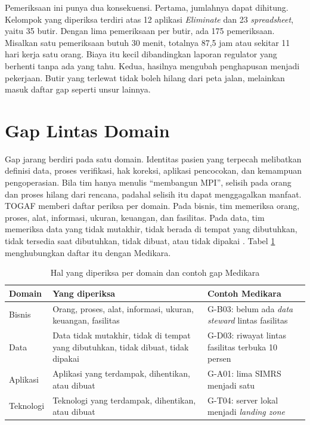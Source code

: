 Pemeriksaan ini punya dua konsekuensi. Pertama, jumlahnya dapat dihitung. Kelompok
yang diperiksa terdiri atas 12 aplikasi \textit{Eliminate} dan 23
\textit{spreadsheet}, yaitu 35 butir. Dengan lima pemeriksaan per butir, ada 175
pemeriksaan. Misalkan satu pemeriksaan butuh 30 menit, totalnya 87,5 jam atau sekitar
11 hari kerja satu orang. Biaya itu kecil dibandingkan laporan regulator yang berhenti
tanpa ada yang tahu. Kedua, hasilnya mengubah penghapusan menjadi pekerjaan. Butir yang
terlewat tidak boleh hilang dari peta jalan, melainkan masuk daftar gap seperti unsur
lainnya.

\section{Gap Lintas Domain}

Gap jarang berdiri pada satu domain. Identitas pasien yang terpecah melibatkan definisi
data, proses verifikasi, hak koreksi, aplikasi pencocokan, dan kemampuan pengoperasian.
Bila tim hanya menulis ``membangun MPI'', selisih pada orang dan proses hilang dari
rencana, padahal selisih itu dapat menggagalkan manfaat. TOGAF memberi daftar periksa
per domain. Pada bisnis, tim memeriksa orang, proses, alat, informasi, ukuran, keuangan,
dan fasilitas. Pada data, tim memeriksa data yang tidak mutakhir, tidak berada di tempat
yang dibutuhkan, tidak tersedia saat dibutuhkan, tidak dibuat, atau tidak dipakai
\cite{c11-togaf9-gap}. Tabel \ref{tab:ch11-jenis-gap} menghubungkan daftar itu dengan
Medikara.

\begin{table}[!htb]
  \centering
  \caption{Hal yang diperiksa per domain dan contoh gap Medikara}
  \label{tab:ch11-jenis-gap}
  \small
  \begin{tabularx}{\textwidth}{>{\raggedright\arraybackslash}p{1.7cm}>{\raggedright\arraybackslash}X>{\raggedright\arraybackslash}X}
    \hline
    \textbf{Domain} & \textbf{Yang diperiksa} & \textbf{Contoh Medikara} \\ \hline
    Bisnis & Orang, proses, alat, informasi, ukuran, keuangan, fasilitas &
      G-B03: belum ada \textit{data steward} lintas fasilitas \\ \hline
    Data & Data tidak mutakhir, tidak di tempat yang dibutuhkan, tidak dibuat, tidak dipakai &
      G-D03: riwayat lintas fasilitas terbuka 10 persen \\ \hline
    Aplikasi & Aplikasi yang terdampak, dihentikan, atau dibuat & G-A01: lima SIMRS menjadi
      satu \\ \hline
    Teknologi & Teknologi yang terdampak, dihentikan, atau dibuat & G-T04: server lokal
      menjadi \textit{landing zone} \\ \hline
  \end{tabularx}
\end{table}


